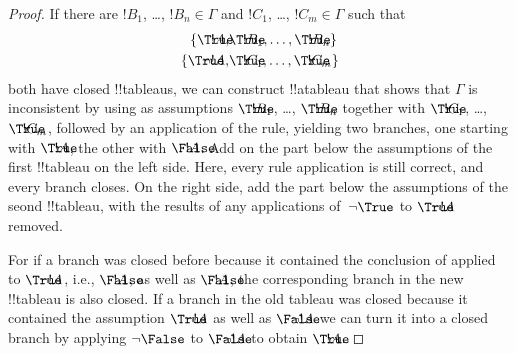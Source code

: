 \documentclass[../../../include/open-logic-section]{subfiles}
\begin{document}
\begin{proof}
  If there are $!B_1$, \dots, $!B_n \in \Gamma$ and $!C_1$, \dots,
  $!C_m \in \Gamma$ such that
  \begin{align*}
    \{\sFmla{\True}{!A}, &
    \sFmla{\True}{!B_1}, \dots, \sFmla{\True}{!B_n}\} \\
    \{\sFmla{\True}{\lnot !A}, &
    \sFmla{\True}{!C_1}, \dots, \sFmla{\True}{!C_m}\}
  \end{align*}
  both have closed !!{tableau}s, we can construct !!a{tableau} that
  shows that $\Gamma$ is inconsistent by using as assumptions
  $\sFmla{\True}{!B_1}$, \dots, $\sFmla{\True}{!B_n}$ together with
  $\sFmla{\True}{!C_1}$, \dots, $\sFmla{\True}{!C_m}$, followed by an
  application of the \Cut{} rule, yielding two branches, one starting
  with $\sFmla{\True}{!A}$, the other with $\sFmla{\False}{!A}$. Add
  on the part below the assumptions of the first !!{tableau} on the
  left side. Here, every rule application is still correct, and every
  branch closes. On the right side, add the part below the assumptions
  of the seond !!{tableau}, with the results of any applications
  of~$\TRule{\True}{\lnot}$ to $\sFmla{\True}{\lnot !A}$ removed.

  For if a branch was closed before because it contained the
  conclusion of \TRule{\True}{\lnot} applied to $\sFmla{\True}{\lnot
    !A}$, i.e., $\sFmla{\False}{!A}$, as well as $\sFmla{\False}{!A}$,
  the corresponding branch in the new !!{tableau} is also closed. If a
  branch in the old tableau was closed because it contained the
  assumption $\sFmla{\True}{\lnot !A}$ as well as
  $\sFmla{\False}{\lnot !A}$ we can turn it into a closed branch by
  applying $\TRule{\False}{\lnot}$ to $\sFmla{\False}{\lnot !A}$ to
  obtain $\sFmla{\True}{!A}$.
  \end{proof}
\end{document}
